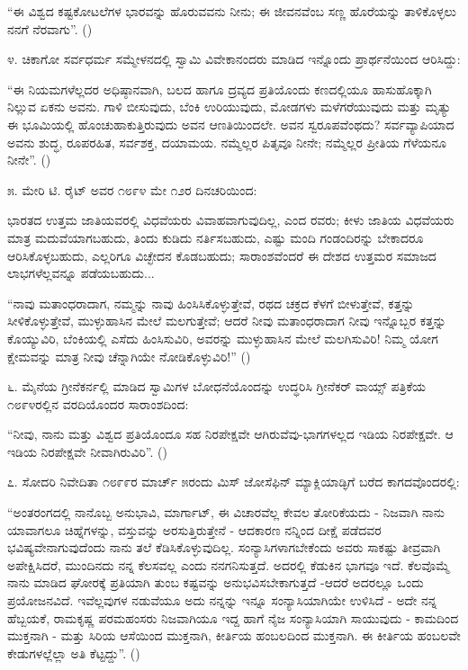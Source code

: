 “ಈ ವಿಶ್ವದ ಕಷ್ಟಕೋಟಲೆಗಳ ಭಾರವನ್ನು ಹೊರುವವನು ನೀನು; ಈ ಜೀವನವೆಂಬ ಸಣ್ಣ ಹೊರೆಯನ್ನು ತಾಳಿಕೊಳ್ಳಲು ನನಗೆ ನೆರವಾಗು”. ()

೪. ಚಿಕಾಗೋ ಸರ್ವಧರ್ಮ ಸಮ್ಮೇಳನದಲ್ಲಿ ಸ್ವಾಮಿ ವಿವೇಕಾನಂದರು ಮಾಡಿದ ಇನ್ನೊಂದು ಪ್ರಾರ್ಥನೆಯಿಂದ ಆರಿಸಿದ್ದು:

“ಈ ನಿಯಮಗಳೆಲ್ಲದರ ಅಧಿಷ್ಠಾನವಾಗಿ, ಬಲದ ಹಾಗೂ ದ್ರವ್ಯದ ಪ್ರತಿಯೊಂದು ಕಣದಲ್ಲಿಯೂ ಹಾಸುಹೊಕ್ಕಾಗಿ ನಿಲ್ಲುವ ಏಕನು ಅವನು. ಗಾಳಿ ಬೀಸುವುದು, ಬೆಂಕಿ ಉರಿಯುವುದು, ಮೋಡಗಳು ಮಳೆಗರೆಯುವುದು ಮತ್ತು ಮೃತ್ಯು ಈ ಭೂಮಿಯಲ್ಲಿ ಹೊಂಚುಹಾಕುತ್ತಿರುವುದು ಅವನ ಆಣತಿಯಿಂದಲೇ. ಅವನ ಸ್ವರೂಪವೆಂಥದು? ಸರ್ವವ್ಯಾಪಿಯಾದ ಅವನು ಶುದ್ಧ, ರೂಪರಹಿತ, ಸರ್ವಶಕ್ತ, ದಯಾಮಯ. ನಮ್ಮೆಲ್ಲರ ಪಿತೃವೂ ನೀನೇ; ನಮ್ಮೆಲ್ಲರ ಪ್ರೀತಿಯ ಗೆಳೆಯನೂ ನೀನೇ”. ()

೫. ಮೇರಿ ಟಿ. ರೈಟ್ ಅವರ ೧೮೯೪ ಮೇ ೧೨ರ ದಿನಚರಿಯಿಂದ:

ಭಾರತದ ಉತ್ತಮ ಜಾತಿಯವರಲ್ಲಿ ವಿಧವೆಯರು ವಿವಾಹವಾಗುವುದಿಲ್ಲ, ಎಂದ ರವರು; ಕೀಳು ಜಾತಿಯ ವಿಧವೆಯರು ಮಾತ್ರ ಮದುವೆಯಾಗಬಹುದು, ತಿಂದು ಕುಡಿದು ನರ್ತಿಸಬಹುದು, ಎಷ್ಟು ಮಂದಿ ಗಂಡಂದಿರನ್ನು ಬೇಕಾದರೂ ಆರಿಸಿಕೊಳ್ಳಬಹುದು, ಎಲ್ಲರಿಗೂ ವಿಚ್ಛೇದನ ಕೊಡಬಹುದು; ಸಾರಾಂಶವೆಂದರೆ ಈ ದೇಶದ ಉತ್ತಮರ ಸಮಾಜದ ಲಾಭಗಳೆಲ್ಲವನ್ನೂ ಪಡೆಯಬಹುದು...

“ನಾವು ಮತಾಂಧರಾದಾಗ, ನಮ್ಮನ್ನು ನಾವು ಹಿಂಸಿಸಿಕೊಳ್ಳುತ್ತೇವೆ, ರಥದ ಚಕ್ರದ ಕೆಳಗೆ ಬೀಳುತ್ತೇವೆ, ಕತ್ತನ್ನು ಸೀಳಿಕೊಳ್ಳುತ್ತೇವೆ, ಮುಳ್ಳುಹಾಸಿನ ಮೇಲೆ ಮಲಗುತ್ತೇವೆ; ಆದರೆ ನೀವು ಮತಾಂಧರಾದಾಗ ನೀವು ಇನ್ನೊಬ್ಬರ ಕತ್ತನ್ನು ಕೊಯ್ಯುವಿರಿ, ಬೆಂಕಿಯಲ್ಲಿ ಎಸೆದು ಹಿಂಸಿಸುವಿರಿ, ಅವರನ್ನು ಮುಳ್ಳುಹಾಸಿನ ಮೇಲೆ ಮಲಗಿಸುವಿರಿ! ನಿಮ್ಮ ಯೋಗ ಕ್ಷೇಮವನ್ನು ಮಾತ್ರ ನೀವು ಚೆನ್ನಾಗಿಯೇ ನೋಡಿಕೊಳ್ಳುವಿರಿ!” ()

೬. ಮೈನೆಯ ಗ್ರೀನೆಕರ್ನಲ್ಲಿ ಮಾಡಿದ ಸ್ವಾಮಿಗಳ ಬೋಧನೆಯೊಂದನ್ನು ಉದ್ಧರಿಸಿ ಗ್ರೀನೆಕರ್ ವಾಯ್ಸ್ ಪತ್ರಿಕೆಯ ೧೮೯೪ರಲ್ಲಿನ ವರದಿಯೊಂದರ ಸಾರಾಂಶದಿಂದ:

“ನೀವು, ನಾನು ಮತ್ತು ವಿಶ್ವದ ಪ್ರತಿಯೊಂದೂ ಸಹ ನಿರಪೇಕ್ಷವೇ ಆಗಿರುವೆವು-ಭಾಗಗಳಲ್ಲದ ಇಡಿಯ ನಿರಪೇಕ್ಷವೇ. ಆ ಇಡಿಯ ನಿರಪೇಕ್ಷವೇ ನೀವಾಗಿರುವಿರಿ”. ()

೭. ಸೋದರಿ ನಿವೇದಿತಾ ೧೮೯೯ರ ಮಾರ್ಚ್ ೫ರಂದು ಮಿಸ್ ಜೋಸೆಫಿನ್ ಮ್ಯಾಕ್ಲಿಯಾಡ್ಳಿಗೆ ಬರೆದ ಕಾಗದವೊಂದರಲ್ಲಿ:

“ಅಂತರಂಗದಲ್ಲಿ ನಾನೊಬ್ಬ ಅನುಭಾವಿ, ಮಾರ್ಗಾಟ್, ಈ ವಿಚಾರವೆಲ್ಲ ಕೇವಲ ತೋರಿಕೆಯದು - ನಿಜವಾಗಿ ನಾನು ಯಾವಾಗಲೂ ಚಿಹ್ನೆಗಳನ್ನು, ವಸ್ತುವನ್ನು ಅರಸುತ್ತಿರುತ್ತೇನೆ - ಆದಕಾರಣ ನನ್ನಿಂದ ದೀಕ್ಷೆ ಪಡೆದವರ ಭವಿಷ್ಯವೇನಾಗುವುದೆಂದು ನಾನು ತಲೆ ಕೆಡಿಸಿಕೊಳ್ಳುವುದಿಲ್ಲ. ಸಂನ್ಯಾಸಿಗಳಾಗಬೇಕೆಂದು ಅವರು ಸಾಕಷ್ಟು ತೀವ್ರವಾಗಿ ಅಪೇಕ್ಷಿಸಿದರೆ, ಮುಂದಿನದು ನನ್ನ ಕೆಲಸವಲ್ಲ ಎಂದು ನನಗನಿಸುತ್ತದೆ. ಅದರಲ್ಲಿ ಕೆಡುಕಿನ ಭಾಗವೂ ಇದೆ. ಕೆಲವೊಮ್ಮೆ ನಾನು ಮಾಡಿದ ಘೋರಕ್ಕೆ ಪ್ರತಿಯಾಗಿ ತುಂಬ ಕಷ್ಟವನ್ನು ಅನುಭವಿಸಬೇಕಾಗುತ್ತದೆ -ಆದರೆ ಅದರಲ್ಲೂ ಒಂದು ಪ್ರಯೋಜನವಿದೆ. ಇವೆಲ್ಲವುಗಳ ನಡುವೆಯೂ ಅದು ನನ್ನನ್ನು ಇನ್ನೂ ಸಂನ್ಯಾಸಿಯಾಗಿಯೇ ಉಳಿಸಿದೆ - ಅದೇ ನನ್ನ ಹೆಬ್ಬಯಕೆ, ರಾಮಕೃಷ್ಣ ಪರಮಹಂಸರು ನಿಜವಾಗಿಯೂ ಇದ್ದ ಹಾಗೆ ನೈಜ ಸಂನ್ಯಾಸಿಯಾಗಿ ಸಾಯುವುದು - ಕಾಮದಿಂದ ಮುಕ್ತನಾಗಿ - ಮತ್ತು ಸಿರಿಯ ಆಸೆಯಿಂದ ಮುಕ್ತನಾಗಿ, ಕೀರ್ತಿಯ ಹಂಬಲದಿಂದ ಮುಕ್ತನಾಗಿ. ಈ ಕೀರ್ತಿಯ ಹಂಬಲವೇ ಕೇಡುಗಳಲ್ಲೆಲ್ಲಾ ಅತಿ ಕೆಟ್ಟದ್ದು”. ()

